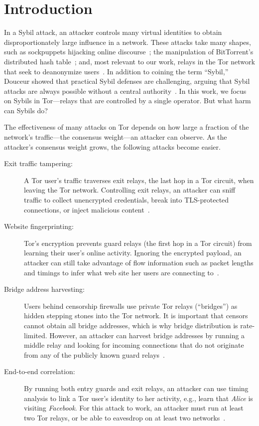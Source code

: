 \section{Introduction}
\label{sec:introduction}
In a Sybil attack, an attacker controls many virtual identities to obtain
disproportionately large influence in a network.  These attacks take many
shapes, such as sockpuppets hijacking online discourse~\cite{Thomas2012a}; the
manipulation of BitTorrent's distributed hash table~\cite{Wang2012a}; and, most
relevant to our work, relays in the Tor network that seek to deanonymize
users~\cite{cmucert}.  In addition to coining the term ``Sybil,'' Douceur showed
that practical Sybil defenses are challenging, arguing that Sybil attacks are
always possible without a central authority~\cite{Douceur2002a}.  In this work,
we focus on Sybils in Tor---relays that are controlled by a single operator.
But what harm can Sybils do?

The effectiveness of many attacks on Tor depends on how large a fraction of the
network's traffic---the consensus weight---an attacker can observe.  As the
attacker's consensus weight grows, the following attacks become easier.

\begin{description}
	\item[Exit traffic tampering:] A Tor user's traffic traverses exit relays,
		the last hop in a Tor circuit, when leaving the Tor network.
		Controlling exit relays, an attacker can sniff traffic to collect
		unencrypted credentials, break into TLS-protected connections, or inject
		malicious content~\cite{Winter2014a}.
	\item[Website fingerprinting:] Tor's encryption prevents guard relays (the
		first hop in a Tor circuit) from learning their user's online activity.
		Ignoring the encrypted payload, an attacker can still take advantage of
		flow information such as packet lengths and timings to infer what web
		site her users are connecting to~\cite{Juarez2014a}.
	\item[Bridge address harvesting:] Users behind censorship firewalls use
		private Tor relays (``bridges'') as hidden stepping stones into the Tor
		network.  It is important that censors cannot obtain all bridge
		addresses, which is why bridge distribution is rate-limited.  However,
		an attacker can harvest bridge addresses by running a middle relay and
		looking for incoming connections that do not originate from any of the
		publicly known guard relays~\cite{Ling2015b}.
	\item[End-to-end correlation:] By running both entry guards and exit relays,
		an attacker can use timing analysis to link a Tor user's identity to her
		activity, e.g., learn that \emph{Alice} is visiting \emph{Facebook}.
		For this attack to work, an attacker must run at least two Tor relays,
		or be able to eavesdrop on at least two networks~\cite{Johnson2013a}.
\end{description}

